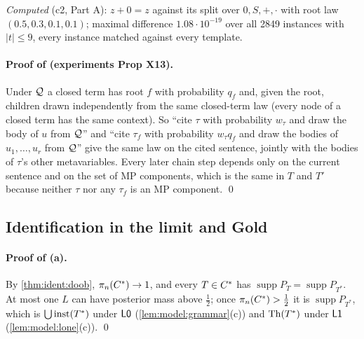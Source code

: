 \emph{Computed} (c2, Part A): $z+0=z$ against its split over $0,S,+,\cdot$ with root law $(0.5,0.3,0.1,0.1)$; maximal difference $1.08\cdot10^{-19}$ over all 2849 instances with $|t|\le9$, every instance matched against every template.

\paragraph{Proof of  (experiments Prop X13).} Under $\mathcal{Q}$ a closed term has root $f$ with probability $q_f$ and, given the root, children drawn independently from the same closed-term law (every node of a closed term has the same context). So ``cite $\tau$ with probability $w_\tau$ and draw the body of $u$ from $\mathcal{Q}$'' and ``cite $\tau_f$ with probability $w_\tau q_f$ and draw the bodies of $u_1,\dots,u_r$ from $\mathcal{Q}$'' give the same law on the cited sentence, jointly with the bodies of $\tau$'s other metavariables. Every later chain step depends only on the current sentence and on the set of MP components, which is the same in $T$ and $T'$ because neither $\tau$ nor any $\tau_f$ is an MP component. \qed

\subsection{Identification in the limit and Gold}\label{app:ident:gold}

\paragraph{Proof of (a).} By \cref{thm:ident:doob}, $\pi_n(C^{*})\to1$, and every $T\in C^{*}$ has $\operatorname{supp}P_T=\operatorname{supp}P_{T^*}$. At most one $L$ can have posterior mass above $\frac12$; once $\pi_n(C^{*})>\frac12$ it is $\operatorname{supp}P_{T^*}$, which is $\bigcup\mathrm{inst}(T^*)$ under $\mathord{\mathsf{L0}}$ (\cref{lem:model:grammar}(c)) and $\mathrm{Th}(T^*)$ under $\mathord{\mathsf{L1}}$ (\cref{lem:model:lone}(c)). \qed

